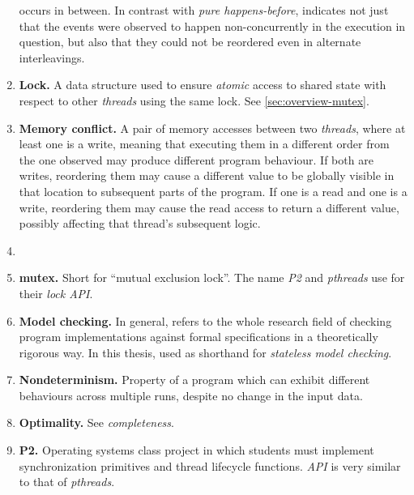 \begin{enumerate}
		occurs in between.
		In contrast with {\em pure happens-before},
		indicates not just that the events were observed
		to happen non-concurrently in the execution in question,
		but also that they could not be reordered even in alternate interleavings.
	\item {\bf Lock.}
		A data structure used to ensure {\em atomic} access to shared state
		with respect to other {\em threads} using the same lock.
		See \cref{sec:overview-mutex}.
	\item {\bf Memory conflict.}
		A pair of memory accesses between two {\em threads}, where at least one is a write,
		meaning that executing them in a different order from the one observed may produce different program behaviour.
		If both are writes, reordering them may cause a different value to be globally visible in that location
		to subsequent parts of the program.
		If one is a read and one is a write, reordering them may cause the read access to return a different value,
		possibly affecting that thread's subsequent logic.
	\item {}
	\item {\bf mutex.}
		Short for ``mutual exclusion lock''. The name {\em P2} and {\em pthreads} use for their {\em lock API}.
	\item {\bf Model checking.}
		In general, refers to the whole research field of checking program implementations against
		formal specifications in a theoretically rigorous way.
		In this thesis, used as shorthand for {\em stateless model checking}.
	\item {\bf Nondeterminism.}
		Property of a program which can exhibit different behaviours across multiple runs,
		despite no change in the input data.
	\item {\bf Optimality.} See {\em completeness}.
	\item {\bf P2.}
		Operating systems class project in which students must implement synchronization primitives
		and thread lifecycle functions.
		{\em API} is very similar to that of {\em pthreads}.

\end{enumerate}
